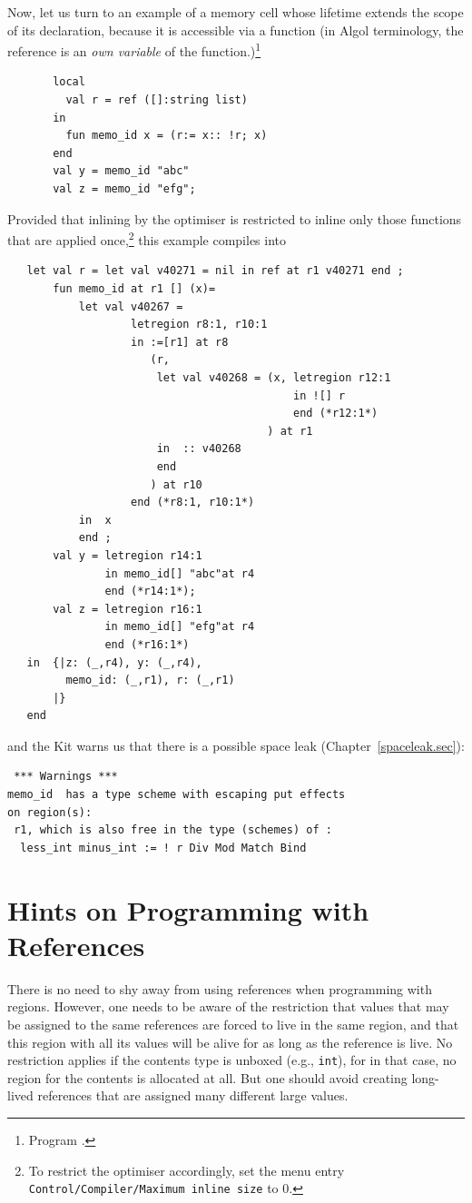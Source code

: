 \documentclass[12pt]{book}
\begin{document}
Now, let us turn to an example of a memory cell whose lifetime
extends the scope of its declaration, because it is
accessible via a function (in Algol terminology,
the reference is an {\em own variable} of the function.)\footnote{Program .}
\begin{verbatim}
       local
         val r = ref ([]:string list)
       in
         fun memo_id x = (r:= x:: !r; x)
       end
       val y = memo_id "abc"
       val z = memo_id "efg";
\end{verbatim}
Provided that inlining by the optimiser is restricted to inline only
those functions that are applied once,\footnote{To restrict the
  optimiser accordingly, set the menu entry {\tt Control/Compiler/Maximum
    inline size} to 0.} this example compiles into
\begin{verbatim}
   let val r = let val v40271 = nil in ref at r1 v40271 end ; 
       fun memo_id at r1 [] (x)= 
           let val v40267 = 
                   letregion r8:1, r10:1 
                   in :=[r1] at r8 
                      (r, 
                       let val v40268 = (x, letregion r12:1 
                                            in ![] r 
                                            end (*r12:1*)
                                        ) at r1
                       in  :: v40268
                       end 
                      ) at r10 
                   end (*r8:1, r10:1*)
           in  x
           end ; 
       val y = letregion r14:1 
               in memo_id[] "abc"at r4 
               end (*r14:1*); 
       val z = letregion r16:1 
               in memo_id[] "efg"at r4 
               end (*r16:1*)
   in  {|z: (_,r4), y: (_,r4), 
         memo_id: (_,r1), r: (_,r1)
       |}
   end 
\end{verbatim}
and the Kit warns us that there is a possible space leak (Chapter~\ref{spaceleak.sec}):
\begin{verbatim}
 *** Warnings ***
memo_id  has a type scheme with escaping put effects 
on region(s): 
 r1, which is also free in the type (schemes) of :  
  less_int minus_int := ! r Div Mod Match Bind
\end{verbatim}

\section{Hints on Programming  with References}
There is no need to shy away from using references when programming
with regions. However, one needs to be aware of the restriction that
values that may be assigned to the same references are forced to live
in the same region, and that this region with all its values will be alive
for as long as the reference is live. No restriction applies if the
contents type is unboxed (e.g., {\tt int}), for in that case, no region
for the contents is allocated at all. But one should avoid creating
long-lived references that are assigned many different large values.
\end{document}
